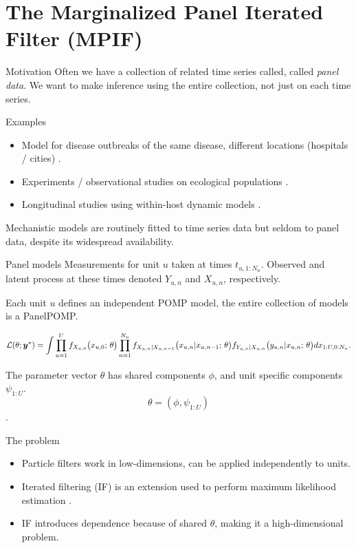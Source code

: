 \documentclass[aspectratio=169]{beamer}\usepackage[]{graphicx}\usepackage[]{xcolor}
\begin{document}
\section{The Marginalized Panel Iterated Filter (MPIF)}

\begin{frame}{Motivation}
Often we have a collection of related time series called, called \emph{panel data}.
We want to make inference using the entire collection, not just on each time series.

Examples
  \begin{itemize}
    \item Model for disease outbreaks of the same disease, different locations (hospitals / cities) \citep{lee20}.
    \item Experiments / observational studies on ecological populations \citep{searle16}.
    \item Longitudinal studies using within-host dynamic models \citep{ranjeva17}.
  \end{itemize}
  
  Mechanistic models are routinely fitted to time series data but seldom to panel data, despite its widespread availability.
  
\end{frame}

\begin{frame}{Panel models}
  Measurements for unit $u$ taken at times $t_{u, 1:N_u}$. Observed and latent process at these times denoted $Y_{u, n}$ and $X_{u, n}$, respectively.
  
  Each unit $u$ defines an independent POMP model, the entire collection of models is a PanelPOMP.
  
  $$
  \mathcal{L}(\theta; \bm{y}^*) = \int \prod_{u = 1}^U f_{X_{u, 0}}\big(x_{u, 0};\, \theta\big)\prod_{n = 1}^{N_u} f_{X_{u, n}|X_{u, n-1}}\big(x_{u, n}|x_{u, n-1}; \, \theta\big)f_{Y_{u, n}|X_{u, n}}\big(y_{u, n}|x_{u, n}; \, \theta\big) dx_{1:U,0:N_u}.
  $$
  
  The parameter vector $\theta$ has shared components $\phi$, and unit specific components $\psi_{1:U}$.
  $$\theta = (\phi, \psi_{1:U})$$.
  
\end{frame}

\begin{frame}{The problem}

  \begin{itemize}
    \item Particle filters work in low-dimensions, can be applied independently to units.
    \item Iterated filtering (IF) is an extension used to perform maximum likelihood estimation \citep{ionides15}.
    \item IF introduces dependence because of shared $\theta$, making it a high-dimensional problem. 
  \end{itemize}

\end{frame}
\end{document}
